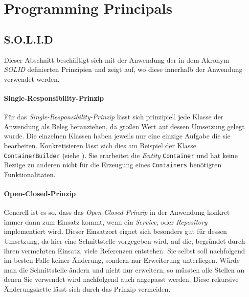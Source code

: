 \section{Programming Principals}
\label{sec:programming_principles}

\subsection{S.O.L.I.D}
\label{subsec:solid}

Dieser Abschnitt beschäftigt sich mit der Anwendung der in dem Akronym \emph{SOLID} definierten Prinzipien und zeigt auf, wo diese innerhalb der Anwendung verwendet werden.

\paragraph{Single-Responsibility-Prinzip}

Für das \emph{Single-Responsibility-Prinzip} lässt sich prinzipiell jede Klasse der Anwendung als Beleg heranziehen, da großen Wert auf dessen Umsetzung gelegt wurde.
Die einzelnen Klassen haben jeweils nur eine einzige Aufgabe die sie bearbeiten.
Konkretisieren lässt sich dies am Beispiel der Klasse \texttt{ContainerBuilder} (siehe ).
Sie erarbeitet die \emph{Entity} \texttt{Container} und hat keine Bezüge zu anderen nicht für die Erzeugung eines \texttt{Containers} benötigten Funktionalitäten.

\bgroup

    \label{lst:container_builder}
\egroup

\paragraph{Open-Closed-Prinzip}

Generell ist es so, dass das \emph{Open-Closed-Prinzip} in der Anwendung konkret immer dann zum Einsatz kommt, wenn ein \emph{Service}, oder \emph{Repository} implementiert wird.
Dieser Einsatzort eignet sich besonders gut für dessen Umsetzung, da hier eine Schnittstelle vorgegeben wird, auf die, begründet durch ihren vermehrten Einsatz, viele Referenzen entstehen. 
Sie selbst soll nachfolgend im besten Falle keiner Änderung, sondern nur Erweiterung unterliegen.
Würde man die Schnittstelle ändern und nicht nur erweitern, so müssten alle Stellen an denen Sie verwendet wird nachfolgend auch angepasst werden.
Diese rekursive Änderungskette lässt sich durch das Prinzip vermeiden.

